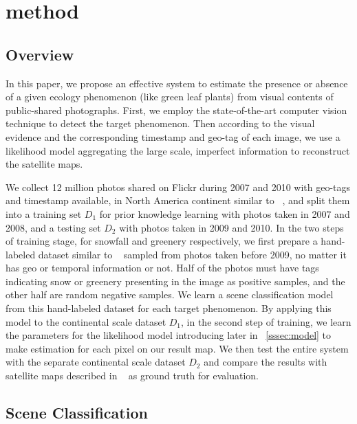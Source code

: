 \section{method}

\subsection{Overview}
In this paper, we propose an effective system to estimate the presence or absence 
of a given ecology phenomenon (like green leaf plants) 
from visual contents of public-shared photographs. First, we employ the state-of-the-art 
computer vision technique to detect the target phenomenon. Then according to the visual evidence 
and the corresponding timestamp and geo-tag of each image, we use a likelihood model 
aggregating the large scale, imperfect information to reconstruct the satellite maps.

We collect 12 million photos shared on Flickr during 2007 and 2010 with geo-tags and timestamp available, 
in North America continent similar to ~\cite{ecology2012www}, and split them into a 
training set $D_1$ for prior knowledge 
learning with photos taken in 2007 and 2008, and a testing set $D_2$ with photos 
taken in 2009 and 2010.
In the two steps of training stage, for snowfall and greenery respectively, we first 
prepare a hand-labeled dataset similar to 
~\cite{wang2013observing} sampled from photos taken 
before 2009, no matter it has geo or temporal 
information or not. Half of the photos must have tags indicating snow or greenery presenting 
in the image as positive samples, and the other half are random negative samples. 
We learn a scene classification model from this hand-labeled dataset for each target phenomenon. By  
applying this model to the continental scale dataset $D_1$, in the second step 
of training, we learn the parameters for the likelihood model introducing later 
in ~\ref{sssec:model} to 
make estimation for each pixel on our result map. We then test the entire system with the separate continental 
scale dataset $D_2$ and compare the results with satellite maps described in ~\cite{ecology2012www} as ground 
truth for evaluation.

\subsection{Scene Classification}
